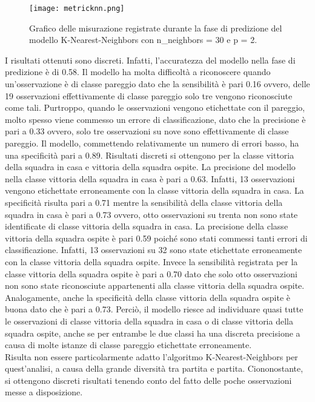 \begin{figure}[h]
	\begin{center}
		\texttt{[image: metricknn.png]}
		\caption{Grafico delle misurazione registrate durante la fase di predizione del modello K-Nearest-Neighbors con\textsf{ n\_neighbors} = 30 e \textsf{p} = 2.
		} 
		\label{fig:knnmetrics}
	\end{center}
\end{figure}
I risultati ottenuti sono discreti. Infatti, l'accuratezza del modello nella fase di predizione è di 0.58. Il modello ha molta difficoltà a riconoscere quando un’osservazione è di classe pareggio dato che la sensibilità è pari 0.16 ovvero, delle 19 osservazioni effettivamente di classe pareggio solo tre vengono riconosciute come tali. Purtroppo, quando le osservazioni vengono etichettate con il pareggio, molto spesso viene commesso un errore di classificazione, dato che la precisione è pari a 0.33 ovvero, solo tre osservazioni su nove %
sono effettivamente di classe pareggio. Il modello, commettendo relativamente un numero di errori basso, ha una specificità pari a 0.89. Risultati discreti si ottengono per la classe vittoria della squadra in casa e vittoria della squadra ospite. La precisione del modello nella classe vittoria della squadra in casa è pari a 0.63. Infatti, 13 osservazioni vengono etichettate erroneamente con la classe vittoria della squadra in casa. La specificità risulta pari a 0.71 mentre la sensibilità della classe vittoria della squadra in casa è pari a 0.73 ovvero, otto osservazioni su trenta non sono state identificate di classe vittoria della squadra in casa. La precisione della classe vittoria della squadra ospite è pari 0.59 poiché sono stati commessi tanti errori di classificazione. Infatti, 13 osservazioni su 32 sono state etichettate erroneamente con la classe vittoria della squadra ospite. Invece la sensibilità registrata per la classe vittoria della squadra ospite è pari a 0.70 dato che solo otto osservazioni non sono state riconosciute appartenenti alla classe vittoria della squadra ospite. Analogamente, anche la specificità della classe vittoria della squadra ospite è buona dato che è pari a 0.73. Perciò, il modello riesce ad individuare quasi tutte le osservazioni di classe vittoria della squadra in casa o di classe vittoria della squadra ospite, anche se per entrambe le due classi ha una discreta precisione a causa di molte istanze di classe pareggio etichettate erroneamente.\\
Risulta non essere particolarmente adatto l'algoritmo K-Nearest-Neighbors per quest'analisi, a causa della grande diversità tra partita e partita. Ciononostante, si ottengono discreti risultati tenendo conto del fatto delle poche osservazioni messe a disposizione.

